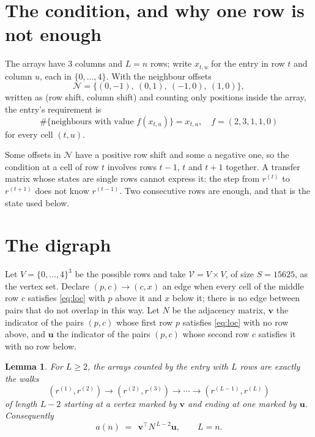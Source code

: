 \documentclass[11pt,a4paper]{article}
\theoremstyle{plain}
\newtheorem{lemma}[theorem]{Lemma}
\theoremstyle{definition}
\begin{document}
\section{The condition, and why one row is not enough}

The arrays have $3$ columns and $L=n$ rows; write $x_{t,u}$ for the entry in
row $t$ and column $u$, each in $\{0,\dots,4\}$. With the neighbour offsets
\[
\mathcal N=\{(0,-1),\ (0,1),\ (-1,0),\ (1,0)\},
\]
written as (row shift, column shift) and counting only positions inside the array, the
entry's requirement is
\begin{equation}\label{eq:loc}
\#\{\text{neighbours with value }f(x_{t,u})\}=x_{t,u},\quad f=(2,3,1,1,0)
\end{equation}
for every cell $(t,u)$.

Some offsets in $\mathcal N$ have a positive row shift and some a negative one, so the
condition at a cell of row $t$ involves rows $t-1$, $t$ and $t+1$ together. A transfer
matrix whose states are single rows cannot express it: the step from $r^{(t)}$ to
$r^{(t+1)}$ does not know $r^{(t-1)}$. Two consecutive rows are enough, and that is
the state used below.

\section{The digraph}

Let $V=\{0,\dots,4\}^{3}$ be the possible rows and take
$\mathcal V=V\times V$, of size $S=15625$, as the vertex set. Declare $(p,c)\to(c,x)$ an edge
when every cell of the middle row $c$ satisfies \eqref{eq:loc} with $p$ above it and $x$
below it; there is no edge between pairs that do not overlap in this way. Let $N$ be the
adjacency matrix, $\mathbf{v}$ the indicator of the pairs $(p,c)$ whose first row $p$
satisfies \eqref{eq:loc} with no row above, and $\mathbf{u}$ the indicator of
the pairs $(p,c)$ whose second row $c$ satisfies it with no row below.

\begin{lemma}\label{lem:walk}
For $L\ge2$, the arrays counted by the entry with $L$ rows are exactly the walks
\[
(r^{(1)},r^{(2)})\to(r^{(2)},r^{(3)})\to\cdots\to(r^{(L-1)},r^{(L)})
\]
of length $L-2$ starting at a vertex marked by $\mathbf{v}$ and ending at one marked by
$\mathbf{u}$. Consequently
\[
a(n)\;=\;\,\mathbf{v}^{\!\top}N^{\,L-2}\mathbf{u},\qquad L=n .
\]
\end{lemma}
\end{document}
